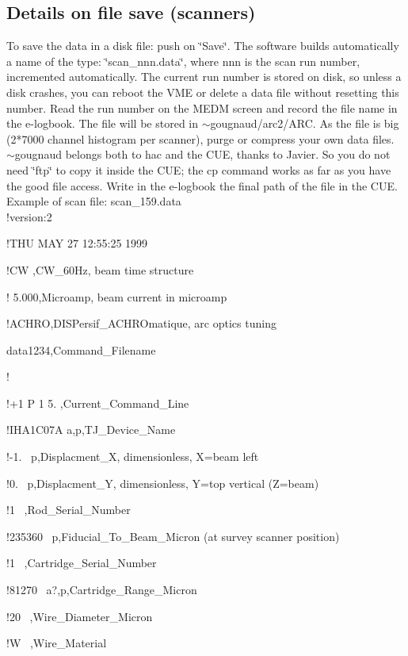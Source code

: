 \subsection{Details on file save (scanners) }

To save the data in a disk file: push on \char`\"{}Save\char`\"{}. The software
builds automatically a name of the type: \char`\"{}scan\_nnn.data\char`\"{},
where nnn is the scan run number, incremented automatically. The current run
number is stored on disk, so unless a disk crashes, you can reboot the VME or
delete a data file without resetting this number. Read the run number on the
MEDM screen and record the file name in the e-logbook. The file will be stored
in \( \sim  \)gougnaud/arc2/ARC. As the file is big (2{*}7000 channel histogram
per scanner), purge or compress your own data files. \( \sim  \)gougnaud belongs
both to hac and the CUE, thanks to Javier. So you do not need \char`\"{}ftp\char`\"{}
to copy it inside the CUE; the cp command works as far as you have the good
file access. Write in the e-logbook the final path of the file in the CUE. \\


Example of scan file: scan\_159.data \\


!version:2 

!THU MAY 27 12:55:25 1999 

!CW ,CW\_60Hz, beam time structure 

! 5.000,Microamp, beam current in microamp 

!ACHRO,DISPersif\_ACHROmatique, arc optics tuning 

data1234,Command\_Filename 

! 

!+1 P 1 5. ,Current\_Command\_Line 

!IHA1C07A a,p,TJ\_Device\_Name 

!-1. ~p,Displacment\_X, dimensionless, X=beam left 

!0. ~p,Displacment\_Y, dimensionless, Y=top vertical (Z=beam) 

!1 ~,Rod\_Serial\_Number 

!235360 ~p,Fiducial\_To\_Beam\_Micron (at survey scanner position) 

!1 ~,Cartridge\_Serial\_Number 

!81270 ~a?,p,Cartridge\_Range\_Micron 

!20 ~,Wire\_Diameter\_Micron 

!W ~,Wire\_Material 

